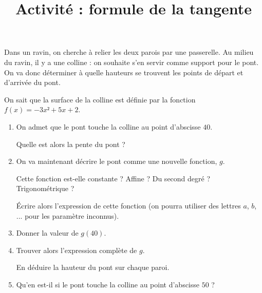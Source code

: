 \documentclass[
	classe=$1^{ere}STI2D$,
	headerTitle=Activité
]{exercice}
\title{Activité : formule de la tangente}
\newcommand{\funcFCoefficientA}{0.0}
\newcommand{\funcFCoefficientB}{-0.3}
\newcommand{\funcFCoefficientC}{2.3}
\newcommand{\funcFCoefficientD}{0}
\newcommand{\funcF}[1]{(\funcFCoefficientA)*#1*#1*#1 + (\funcFCoefficientB)*#1*#1 + (\funcFCoefficientC)*#1 + (\funcFCoefficientD)}
\newcommand{\funcPrimeF}[1]{3*(\funcFCoefficientA)*#1*#1 + 2*(\funcFCoefficientB)*#1 + (\funcFCoefficientC)}
\newcommand{\tangenteEnA}[2]{(\funcPrimeF{#1})*#2 + (\funcF{#1}) - #1*(\funcPrimeF{#1})}
\newcommand{\PointTangent}{4}
\newcommand{\XDebut}{0}
\newcommand{\XFin}{8}
\begin{document}
\maketitle

\begin{center}
\end{center}

Dans un ravin, on cherche à relier les deux parois par une passerelle. Au milieu du ravin, il y a une colline : on souhaite s'en servir comme support pour le pont. On va donc déterminer à quelle hauteurs se trouvent les points de départ et d'arrivée du pont. \bigskip

On sait que la surface de la colline est définie par la fonction $f(x) = -3x² + 5x + 2$.

\begin{enumerate}
	\item On admet que le pont touche la colline au point d'abscisse $40$.

	      Quelle est alors la pente du pont ?
	\item On va maintenant décrire le pont comme une nouvelle fonction, $g$.

	      Cette fonction est-elle constante ? Affine ? Du second degré ? Trigonométrique ?

	      Écrire alors l'expression de cette fonction (on pourra utiliser des lettres $a$, $b$, ... pour les paramètre inconnus).
	\item Donner la valeur de $g(40)$.
	\item Trouver alors l'expression complète de $g$.

	      En déduire la hauteur du pont sur chaque paroi.
	\item Qu'en est-il si le pont touche la colline au point d'abscisse $50$ ?
\end{enumerate}
\end{document}
